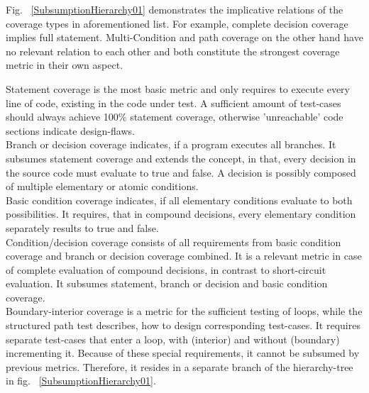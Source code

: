 	Fig. ~\ref{SubsumptionHierarchy01} demonstrates the implicative relations of the coverage types in aforementioned list. For example, complete decision coverage implies	full statement. Multi-Condition and path coverage on the other hand have no relevant relation to each other and both constitute the strongest coverage metric in their own aspect. \\
	

	Statement coverage is the most basic metric and only requires to execute every line of code, existing in the code under test. A sufficient amount of test-cases should always achieve 100\% statement coverage, otherwise 'unreachable' code sections indicate design-flaws. \\
	
	Branch or decision coverage indicates, if a program executes all branches. It subsumes statement coverage and extends the concept, in that, every decision in the source code must evaluate to true and false. A decision is possibly composed of multiple elementary or atomic conditions. \\
	
	Basic condition coverage indicates, if all elementary conditions evaluate to both possibilities. It requires, that in compound decisions, every elementary condition separately results to true and false.  \\

	Condition/decision coverage consists of all requirements from basic condition coverage and branch or decision coverage combined. It is a relevant metric in case of complete evaluation of compound decisions, in contrast to short-circuit evaluation. It subsumes statement, branch or decision and basic condition coverage. \\
	
	Boundary-interior coverage is a metric for the sufficient testing of loops, while the structured path test describes, how to design corresponding test-cases. It requires separate test-cases that enter a loop, with (interior) and without (boundary) incrementing it.	Because of these special requirements, it cannot be subsumed by previous metrics. Therefore, it resides in a separate branch of the hierarchy-tree in fig. ~\ref{SubsumptionHierarchy01}. \\

